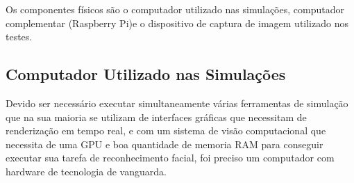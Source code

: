 Os componentes físicos são o computador utilizado nas simulações, computador complementar (Raspberry Pi)e o dispositivo de captura de imagem utilizado nos testes.

\subsection{Computador Utilizado nas Simulações}
\label{subsec:compsim}

Devido ser necessário executar simultaneamente várias ferramentas de simulação que na sua maioria se utilizam de interfaces gráficas que necessitam de renderização em tempo real, e com um sistema de visão computacional que necessita de uma GPU e boa quantidade de memoria RAM para conseguir executar sua tarefa de reconhecimento facial, foi preciso um computador com hardware de tecnologia de vanguarda.

